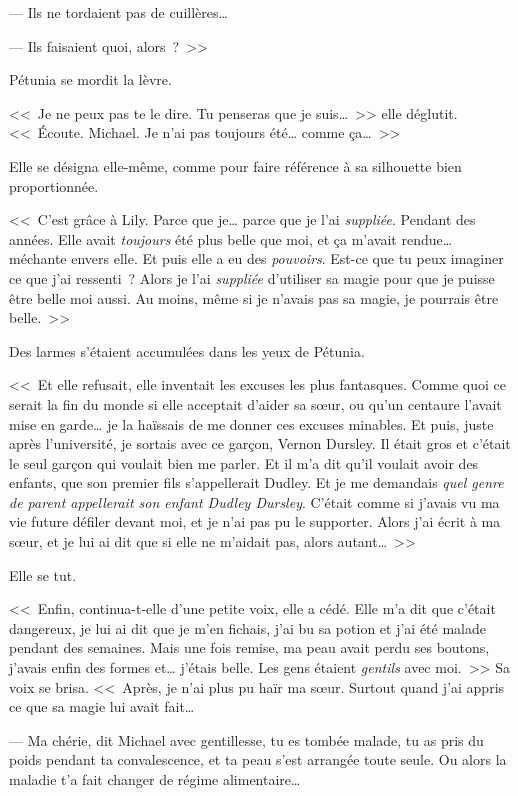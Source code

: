 --- Ils ne tordaient pas de cuillères…

--- Ils faisaient quoi, alors~?~>>

Pétunia se mordit la lèvre.

<<~Je ne peux pas te le dire. Tu penseras que je suis…~>> elle déglutit. <<~Écoute. Michael. Je n'ai pas toujours été… comme ça…~>>

Elle se désigna elle-même, comme pour faire référence à sa silhouette bien proportionnée.

<<~C'est grâce à Lily. Parce que je… parce que je l'ai \emph{suppliée}. Pendant des années. Elle avait \emph{toujours} été plus belle que moi, et ça m'avait rendue… méchante envers elle. Et puis elle a eu des \emph{pouvoirs}. Est-ce que tu peux imaginer ce que j'ai ressenti~? Alors je l'ai \emph{suppliée} d'utiliser sa magie pour que je puisse être belle moi aussi. Au moins, même si je n'avais pas sa magie, je pourrais être belle.~>>

Des larmes s'étaient accumulées dans les yeux de Pétunia.

<<~Et elle refusait, elle inventait les excuses les plus fantasques. Comme quoi ce serait la fin du monde si elle acceptait d'aider sa sœur, ou qu'un centaure l'avait mise en garde… je la haïssais de me donner ces excuses minables. Et puis, juste après l'université, je sortais avec ce garçon, Vernon Dursley. Il était gros et c'était le seul garçon qui voulait bien me parler. Et il m'a dit qu'il voulait avoir des enfants, que son premier fils s'appellerait Dudley. Et je me demandais \emph{quel genre de parent appellerait son enfant Dudley Dursley}. C'était comme si j'avais vu ma vie future défiler devant moi, et je n'ai pas pu le supporter. Alors j'ai écrit à ma sœur, et je lui ai dit que si elle ne m'aidait pas, alors autant…~>>

Elle se tut.

<<~Enfin, continua-t-elle d'une petite voix, elle a cédé. Elle m'a dit que c'était dangereux, je lui ai dit que je m'en fichais, j'ai bu sa potion et j'ai été malade pendant des semaines. Mais une fois remise, ma peau avait perdu ses boutons, j'avais enfin des formes et… j'étais belle. Les gens étaient \emph{gentils} avec moi.~>> Sa voix se brisa. <<~Après, je n'ai plus pu haïr ma sœur. Surtout quand j'ai appris ce que sa magie lui avait fait…

--- Ma chérie, dit Michael avec gentillesse, tu es tombée malade, tu as pris du poids pendant ta convalescence, et ta peau s'est arrangée toute seule. Ou alors la maladie t'a fait changer de régime alimentaire…

